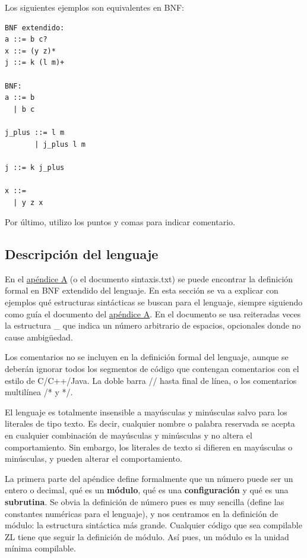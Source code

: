 \documentclass{report}
\begin{document}
	\vspace{10px}
	
	Los siguientes ejemplos son equivalentes en BNF:
	
	\begin{BVerbatim}
BNF extendido:
a ::= b c?
x ::= (y z)*
j ::= k (l m)+
	
BNF:
a ::= b
  | b c

j_plus ::= l m
       | j_plus l m	

j ::= k j_plus

x ::= 
  | y z x
	\end{BVerbatim}
	
	Por último, utilizo los puntos y comas para indicar comentario.
	
	\subsection{Descripción del lenguaje}
	
	En el \hyperref[app:a]{apéndice A} (o el documento sintaxis.txt) se puede encontrar la definición formal en BNF extendido del lenguaje. En esta sección se va a explicar con ejemplos qué estructuras sintácticas se buscan para el lenguaje, siempre siguiendo como guía el documento del \hyperref[app:a]{apéndice A}. En el documento se usa reiteradas veces la estructura \_ que indica un número arbitrario de espacios, opcionales donde no cause ambigüedad. 
	
	\vspace{10px}
	
	Los comentarios no se incluyen en la definición formal del lenguaje, aunque se deberán ignorar todos los segmentos de código que contengan comentarios con el estilo de C/C++/Java. La doble barra // hasta final de línea, o los comentarios multilínea /* y */.
	
	\vspace{10px}
	
	El lenguaje es totalmente insensible a mayúsculas y minúsculas salvo para los literales de tipo texto. Es decir, cualquier nombre o palabra reservada se acepta en cualquier combinación de mayúsculas y minúsculas y no altera el comportamiento. Sin embargo, los literales de texto si difieren en mayúsculas o minúsculas, y pueden alterar el comportamiento.
	
	\vspace{10px}
	
	La primera parte del apéndice define formalmente que un número puede ser un entero o decimal, qué es un \textbf{módulo}, qué es una \textbf{configuración} y qué es una \textbf{subrutina}. Se obvia la definición de número pues es muy sencilla (define las constantes numéricas para el lenguaje), y nos centramos en la definición de módulo: la estructura sintáctica más grande. Cualquier código que sea compilable ZL tiene que seguir la definición de módulo. Así pues, un módulo es la unidad mínima compilable.   
	
\end{document}
